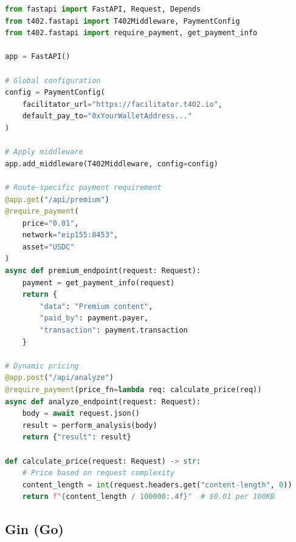 \begin{lstlisting}[language=python,caption={Complete FastAPI server setup}]
from fastapi import FastAPI, Request, Depends
from t402.fastapi import T402Middleware, PaymentConfig
from t402.fastapi import require_payment, get_payment_info

app = FastAPI()

# Global configuration
config = PaymentConfig(
    facilitator_url="https://facilitator.t402.io",
    default_pay_to="0xYourWalletAddress..."
)

# Apply middleware
app.add_middleware(T402Middleware, config=config)

# Route-specific payment requirement
@app.get("/api/premium")
@require_payment(
    price="0.01",
    network="eip155:8453",
    asset="USDC"
)
async def premium_endpoint(request: Request):
    payment = get_payment_info(request)
    return {
        "data": "Premium content",
        "paid_by": payment.payer,
        "transaction": payment.transaction
    }

# Dynamic pricing
@app.post("/api/analyze")
@require_payment(price_fn=lambda req: calculate_price(req))
async def analyze_endpoint(request: Request):
    body = await request.json()
    result = perform_analysis(body)
    return {"result": result}

def calculate_price(request: Request) -> str:
    # Price based on request complexity
    content_length = int(request.headers.get("content-length", 0))
    return f"{content_length / 100000:.4f}"  # $0.01 per 100KB
\end{lstlisting}

\subsection{Gin (Go)}

